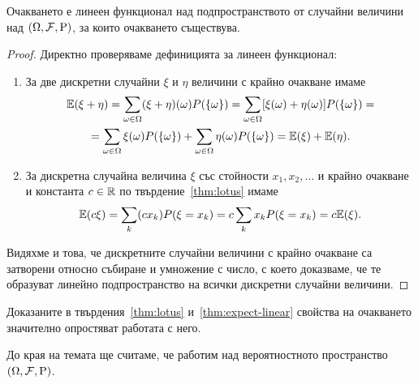 \documentclass[numbers=endperiod, DIV=15, bibliography=totocnumbered]{scrartcl}
\begin{document}
\begin{proposition}\label{thm:expect-linear}
  Очакването е линеен функционал над подпространството от случайни величини над $(\Omega, \mathcal{F}, \operatorname{P})$, за които очакването съществува.
\end{proposition}
\begin{proof}
  Директно проверяваме дефиницията за линеен функционал:
  \begin{enumerate}
    \item За две дискретни случайни $\xi$ и $\eta$ величини с крайно очакване имаме
    \begin{multline*}
      \mathbb{E}(\xi + \eta)
      =
      \sum_{\omega \in \Omega} (\xi + \eta) (\omega) P(\{ \omega \})
      =
      \sum_{\omega \in \Omega} [\xi (\omega) + \eta (\omega)] P(\{ \omega \})
      = \\ =
      \sum_{\omega \in \Omega} \xi (\omega) P(\{ \omega \}) + \sum_{\omega \in \Omega} \eta (\omega) P(\{ \omega \})
      =
      \mathbb{E}(\xi) + \mathbb{E}(\eta).
    \end{multline*}

    \item За дискретна случайна величина $\xi$ със стойности $x_1, x_2, \ldots$ и крайно очакване и константа $c \in \mathbb{R}$ по твърдение~\ref{thm:lotus} имаме
    \begin{displaymath}
      \mathbb{E}(c \xi)
      =
      \sum_k (c x_k) P(\xi = x_k)
      =
      c \sum_k x_k P(\xi = x_k)
      =
      c \mathbb{E}(\xi).
    \end{displaymath}
  \end{enumerate}

  Видяхме и това, че дискретните случайни величини с крайно очакване са затворени относно събиране и умножение с число, с което доказваме, че те образуват линейно подпространство на всички дискретни случайни величини.
\end{proof}

Доказаните в твърдения~\ref{thm:lotus} и~\ref{thm:expect-linear} свойства на очакването значително опростяват работата с него.

До края на темата ще считаме, че работим над вероятностното пространство $(\Omega, \mathcal{F}, \operatorname{P})$.
\end{document}
